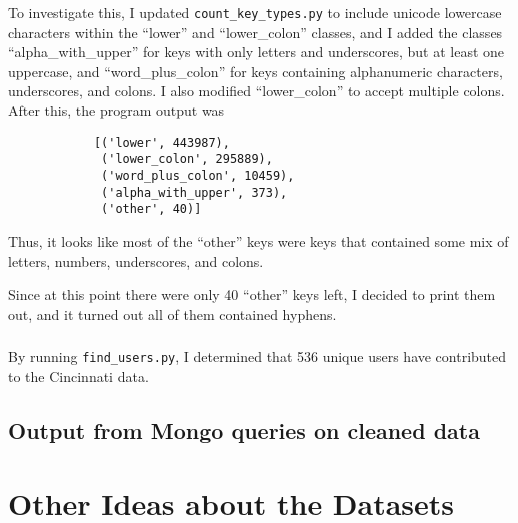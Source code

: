 \documentclass{article}
\begin{document}
            To investigate this, I updated \texttt{count\_key\_types.py} to
            include unicode lowercase characters within the ``lower'' and
            ``lower\_colon'' classes, and I added the classes
            ``alpha\_with\_upper'' for keys with only letters and underscores,
            but at least one uppercase, and ``word\_plus\_colon'' for keys
            containing alphanumeric characters, underscores, and colons. I also
            modified ``lower\_colon'' to accept multiple colons. After this, the
            program output was 
            \begin{lstlisting}
            [('lower', 443987),
             ('lower_colon', 295889),
             ('word_plus_colon', 10459),
             ('alpha_with_upper', 373),
             ('other', 40)]
            \end{lstlisting}
            Thus, it looks like most of the ``other'' keys were keys that
            contained some mix of letters, numbers, underscores, and colons.
            
            Since at this point there were only 40 ``other'' keys left, I
            decided to print them out, and it turned out all of them contained
            hyphens.

            \subsubsection{}
            By running \texttt{find\_users.py}, I determined that 536 unique
            users have contributed to the Cincinnati data.
        \subsection{Output from Mongo queries on cleaned data}
    \section{Other Ideas about the Datasets}
\end{document}

